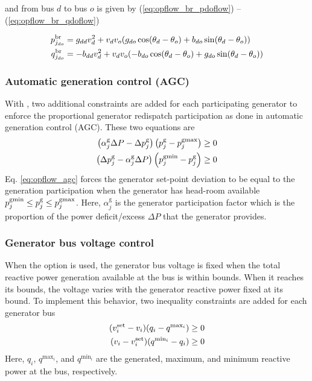 \noindent
and from bus $d$ to bus $o$ is given by (\ref{eq:opflow_br_pdoflow}) -- (\ref{eq:opflow_br_qdoflow})

\begin{align}
p^\text{br}_{j_{do}} &= g_{dd}{v^2_d} + v_dv_o(g_{do}\cos(\theta_d - \theta_o) + b_{do}\sin(\theta_d - \theta_o))  \label{eq:opflow_br_pdoflow} \\
q^\text{br}_{j_{do}} &= -b_{dd}{v^2_d} + v_dv_o(-b_{do}\cos(\theta_d - \theta_o) + g_{do}\sin(\theta_d - \theta_o)) \label{eq:opflow_br_qdoflow}
\end{align}

\subsubsection{Automatic generation control (AGC)}
With \option{\opflowuseagc}, two additional constraints are added for each participating generator to enforce the proportional generator redispatch participation as done in automatic generation control (AGC). These two equations are 
\begin{equation}
\begin{aligned}
  \left(\alpha^{\text{g}}_j\Delta{P} - \Delta{p}^\text{g}_j\right)\left(p^\text{g}_j - p^\text{gmax}_j\right) \ge 0 \\
  \left(\Delta{p}^\text{g}_j - \alpha^{\text{g}}_j\Delta{P}\right)\left(p^\text{gmin}_j - p^\text{g}_j\right) \ge 0
\end{aligned}
\label{eq:opflow_agc}
\end{equation}
Eq. \ref{eq:opflow_agc} forces the generator set-point deviation to be equal to the generation participation when the generator has head-room available $p^\text{gmin}_j \le p^\text{g}_j \le p^\text{gmax}_j$. Here, $\alpha^{\text{g}}_j$ is the generator participation factor which is the proportion of the power deficit/excess $\Delta{P}$ that the generator provides.

\subsubsection{Generator bus voltage control}
When the option \opflowoption{\opflowgenbusvoltage~\fixedwithinqbounds} is used, the generator bus voltage is fixed when the total reactive power generation available at the bus is within bounds. When it reaches its bounds, the voltage varies with the generator reactive power fixed at its bound. To implement this behavior, two inequality constraints are added for each generator bus
\begin{equation}
\begin{aligned}
(v^{\text{set}}_i - v_i)(q_i - q^{\text{max}_i}) \ge 0 \\
(v_i - v^{\text{set}}_i)(q^{\text{min}_i} - q_i) \ge 0
\end{aligned}
\label{eq:opflow_genbusvoltage}
\end{equation}
Here, $q_i$, $q^{\text{max}_i}$, and $q^{\text{min}_i}$ are the generated, maximum, and minimum reactive power at the bus, respectively.

